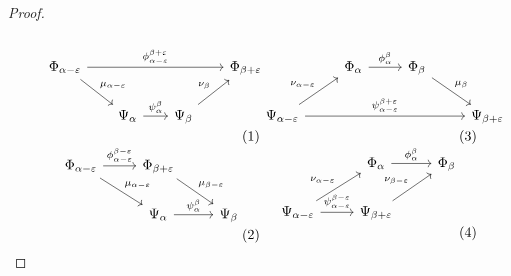 \begin{proof}
  \begin{subequations}
  \begin{minipage}{0.45\textwidth}
  \begin{equation}\label{dgm:intr1}\begin{tikzcd}[column sep=scriptsize]
    \Phi_{\alpha-\e}  \arrow[to=Fb, "\phi_{\alpha-\e}^{\beta+\e}"]
                      \arrow[to=Ga, "\mu_{\alpha-\e}"]
    & & & |[alias=Fb]|
      \Phi_{\beta+\e} \\
    & |[alias=Ga]|
    \Psi_\alpha \arrow[to=Gb, "\psi_\alpha^\beta"]
    & |[alias=Gb]|
      \Psi_\beta \arrow[to=Fb, "\nu_\beta"] &
  \end{tikzcd}\end{equation}
  \begin{equation}\label{dgm:intr3}\begin{tikzcd}
    \Phi_{\alpha-\e}  \arrow[to=Fb, "\phi_{\alpha-\e}^{\beta-\e}"]
                      \arrow[to=Ga, "\mu_{\alpha-\e}"]
    & |[alias=Fb]|
      \Phi_{\beta+\e} \arrow[to=Gb, "\mu_{\beta -\e}"] \\
    & |[alias=Ga]|
    \Psi_\alpha \arrow[to=Gb, "\psi_\alpha^\beta"]
    & |[alias=Gb]|
      \Psi_\beta
  \end{tikzcd}\end{equation}
  \end{minipage} \begin{minipage}{0.45\textwidth}
  \begin{equation}\label{dgm:intr2}\begin{tikzcd}
    & |[alias=Fa]|
    \Phi_\alpha  \arrow[to=Fb, "\phi_\alpha^\beta"]
    & |[alias=Fb]|
      \Phi_\beta  \arrow[to=Gb, "\mu_\beta"] & \\
    \Psi_{\alpha-\e}  \arrow[to=Gb, "\psi_{\alpha-\e}^{\beta+\e}"]
                      \arrow[to=Fa, "\nu_{\alpha-\e}"]
    & & & |[alias=Gb]|
      \Psi_{\beta + \e}
  \end{tikzcd}\end{equation}
  \begin{equation}\label{dgm:intr4}\begin{tikzcd}
    & |[alias=Fa]|
    \Phi_\alpha  \arrow[to=Fb, "\phi_\alpha^\beta"]
    & |[alias=Fb]|
      \Phi_\beta\\
    \Psi_{\alpha-\e}  \arrow[to=Gb, "\psi_{\alpha-\e}^{\beta-\e}"]
                      \arrow[to=Fa, "\nu_{\alpha-\e}"]
    & |[alias=Gb]|
      \Psi_{\beta + \e} \arrow[to=Fb, "\nu_{\beta-\e}"]&
  \end{tikzcd}\end{equation}
  \end{minipage}
  \end{subequations}


\end{proof}
